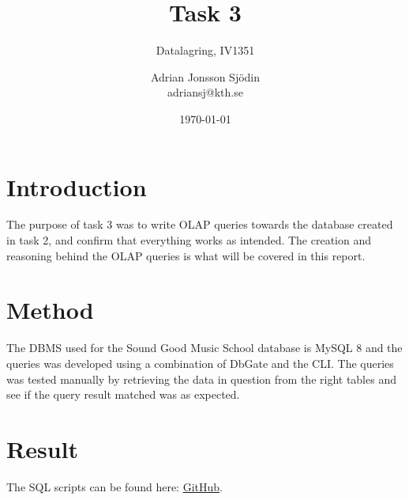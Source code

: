 \documentclass[a4paper]{scrreprt}
\title{Task 3}
\subtitle{Datalagring, IV1351}
\author{Adrian Jonsson Sjödin \\ adriansj@kth.se}
\date{\today}
\begin{document}
\maketitle

\tableofcontents %

\chapter{Introduction}
The purpose of task 3 was to write OLAP queries towards the database created in task 2, and confirm that everything works as intended. The creation and reasoning behind 
the OLAP queries is what will be covered in this report.

\chapter{Method}
The DBMS used for the Sound Good Music School database is MySQL 8 and the queries was developed using a combination of DbGate and the CLI. The queries was tested manually 
by retrieving the data in question from the right tables and see if the query result matched was as expected.


\chapter{Result}
\label{sec:result}
The SQL scripts can be found here:
 \href{https://github.com/adrian-jonsson-sjoedin/IV1351-Datalagring/tree/main/project/SQL}{GitHub}.
\end{document}
